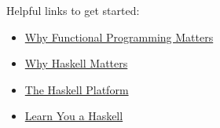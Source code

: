 \begin{frame}
  Helpful links to get started:

  \begin{itemize}
    \item \href{http://www.cse.chalmers.se/~rjmh/Papers/whyfp.pdf}{Why Functional Programming Matters}
    \item \href{http://haskell.org/haskellwiki/Why_Haskell_matters}{Why Haskell Matters}
    \item \href{http://hackage.haskell.org/platform/}{The Haskell Platform}
    \item \href{http://learnyouahaskell.com/}{Learn You a Haskell}
  \end{itemize}
\end{frame}
